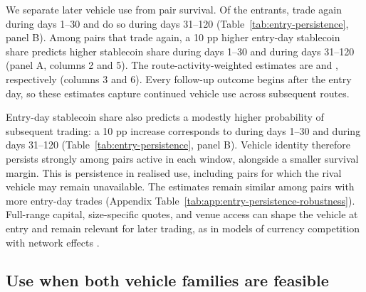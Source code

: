 We separate later vehicle use from pair survival. Of the \EntryPersistenceEntrants{} entrants, \EntryPersistenceEarlyRetradeRate{} trade again during days 1--30 and \EntryPersistenceLateRetradeRate{} do so during days 31--120 (Table~\ref{tab:entry-persistence}, panel B). Among pairs that trade again, a 10 pp higher entry-day stablecoin share predicts \EntryPersistenceEarlyPairEffectPerTen{} higher stablecoin share during days 1--30 and \EntryPersistenceLatePairEffectPerTen{} during days 31--120 (panel A, columns 2 and 5). The route-activity-weighted estimates are \EntryPersistenceEarlyActivityEffectPerTen{} and \EntryPersistenceLateActivityEffectPerTen{}, respectively (columns 3 and 6). Every follow-up outcome begins after the entry day, so these estimates capture continued vehicle use across subsequent routes.

Entry-day stablecoin share also predicts a modestly higher probability of subsequent trading: a 10 pp increase corresponds to \EntryPersistenceEarlyRetradeEffectPerTen{} during days 1--30 and \EntryPersistenceLateRetradeEffectPerTen{} during days 31--120 (Table~\ref{tab:entry-persistence}, panel B). Vehicle identity therefore persists strongly among pairs active in each window, alongside a smaller survival margin. This is persistence in realised use, including pairs for which the rival vehicle may remain unavailable. The estimates remain similar among pairs with more entry-day trades (Appendix Table~\ref{tab:app:entry-persistence-robustness}). Full-range capital, size-specific quotes, and venue access can shape the vehicle at entry and remain relevant for later trading, as in models of currency competition with network effects \citep{DowdGreenaway1993CurrencyCompetition}.

\subsection{Use when both vehicle families are feasible}

